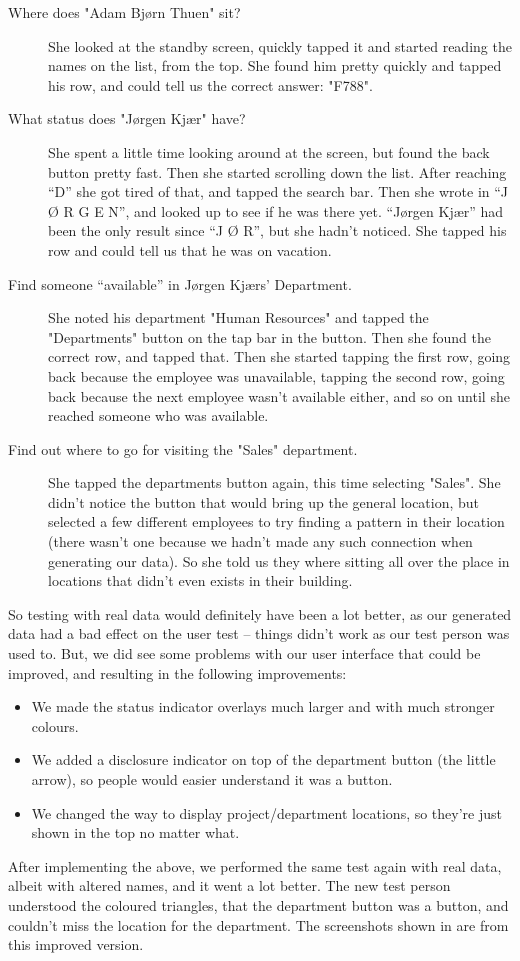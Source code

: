 \begin{description}
\item[Where does "Adam Bjørn Thuen" sit?] She looked at the standby
  screen, quickly tapped it and started reading the names on the list,
  from the top. She found him pretty quickly and tapped his row, and
  could tell us the correct answer: "F788".
\item[What status does "Jørgen Kjær" have?] She spent a little time
  looking around at the screen, but found the back button pretty
  fast. Then she started scrolling down the list. After reaching ``D'' she
  got tired of that, and tapped the search bar. Then she wrote in ``J Ø
  R G E N'', and looked up to see if he was there yet. ``Jørgen Kjær'' had
  been the only result since ``J Ø R'', but she hadn't noticed. She
  tapped his row and could tell us that he was on vacation.
\item[Find someone ``available'' in Jørgen Kjærs' Department.] She
  noted his department "Human Resources" and tapped the "Departments"
  button on the tap bar in the button. Then she found the correct row,
  and tapped that. Then she started tapping the first row, going back
  because the employee was unavailable, tapping the second row, going
  back because the next employee wasn't available either, and so on
  until she reached someone who was available.
\item[Find out where to go for visiting the "Sales" department.] She
  tapped the departments button again, this time selecting
  "Sales". She didn't notice the button that would bring up the
  general location, but selected a few different employees to try
  finding a pattern in their location (there wasn't one because we
  hadn't made any such connection when generating our data). So she
  told us they where sitting all over the place in locations that
  didn't even exists in their building.
\end{description}

So testing with real data would definitely have been a lot better, as
our generated data had a bad effect on the user test -- things didn't
work as our test person was used to. But, we did see some problems
with our user interface that could be improved, and resulting in the
following improvements:

\begin{itemize}
\item We made the status indicator overlays much larger and with much
  stronger colours.
\item We added a disclosure indicator on top of the department button
  (the little arrow), so people would easier understand it was a
  button.
\item We changed the way to display project/department locations, so
  they're just shown in the top no matter what.
\end{itemize}

After implementing the above, we performed the same test again with
real data, albeit with altered names, and it went a lot better. The
new test person understood the coloured triangles, that the department
button was a button, and couldn't miss the location for the
department. The screenshots shown in  are from this
improved version.

